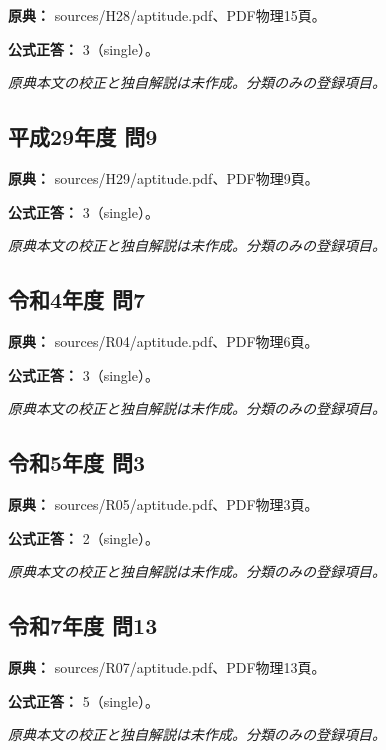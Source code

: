 \noindent\textbf{原典：} sources/H28/aptitude.pdf、PDF物理15頁。

\textbf{公式正答：} 3（single）。

\par\textit{原典本文の校正と独自解説は未作成。分類のみの登録項目。}

\subsection{平成29年度 問9}
\label{q:h29-reg-apt-09}

\noindent\textbf{原典：} sources/H29/aptitude.pdf、PDF物理9頁。

\textbf{公式正答：} 3（single）。

\par\textit{原典本文の校正と独自解説は未作成。分類のみの登録項目。}

\subsection{令和4年度 問7}
\label{q:r04-reg-apt-07}

\noindent\textbf{原典：} sources/R04/aptitude.pdf、PDF物理6頁。

\textbf{公式正答：} 3（single）。

\par\textit{原典本文の校正と独自解説は未作成。分類のみの登録項目。}

\subsection{令和5年度 問3}
\label{q:r05-reg-apt-03}

\noindent\textbf{原典：} sources/R05/aptitude.pdf、PDF物理3頁。

\textbf{公式正答：} 2（single）。

\par\textit{原典本文の校正と独自解説は未作成。分類のみの登録項目。}

\subsection{令和7年度 問13}
\label{q:r07-reg-apt-13}

\noindent\textbf{原典：} sources/R07/aptitude.pdf、PDF物理13頁。

\textbf{公式正答：} 5（single）。

\par\textit{原典本文の校正と独自解説は未作成。分類のみの登録項目。}

